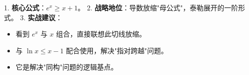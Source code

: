 \begin{summarybox}
1. \textbf{核心公式}：$e^x \geqslant x + 1$。
2. \textbf{战略地位}：导数放缩"母公式"，泰勒展开的一阶形式。
3. \textbf{实战建议}：
    \begin{itemize}
        \item 看到 $e^x$ 与 $x$ 组合，直接联想此切线放缩。
        \item 与 $\ln x \leqslant x-1$ 配合使用，解决"指对跨越"问题。
        \item 它是解决"同构"问题的逻辑基点。
    \end{itemize}
\end{summarybox}